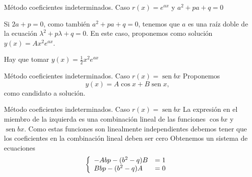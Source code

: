 \documentclass[handout,hyperref={colorlinks=true}]{beamer}
\DeclareMathOperator{\sen}{sen}
\begin{document}
 \begin{frame}{Método coeficientes indeterminados. Caso $r(x)=e^{a x}$  y $a^2+pa+q= 0$}

 Si $2a+p=0$, como también $a^2+pa+q=0$, tenemos que $a$ es una raíz doble de la ecuación $\lambda^2+p\lambda+q=0$. 
 En este caso, proponemos como solución $y(x)=Ax^2e^{ax}$. 
 
 \lstI
 
 Hay que tomar $\boxed{y(x)=\frac{1}{2}x^2e^{ax}}$
 
 
\end{frame}
 
 
 
 \begin{frame}{Método coeficientes indeterminados. Caso $r(x)=\sen bx$}
 Proponemos 
 \[y(x)=A\cos x+ B\sen x,\]
 como candidato a solución. 
 
 \lstI
 
 
 
\end{frame}
 
 
 
 \begin{frame}{Método coeficientes indeterminados. Caso $r(x)=\sen bx$}
La expresión en el miembro de la izquierda es una combinación lineal de las funciones $\cos bx$ y $\sen bx$. Como estas funciones son linealmente independientes
debemos tener que los coeficientes en la combinación lineal deben ser cero
\lstI
Obtenemos un sistema de ecuaciones
\begin{equation}\label{sist_lin_1}
  \left\{\begin{array}{l l}
          -Abp - (b^2 - q)B & = 1\\
          Bbp - (b^2 - q)A &=0
         \end{array}
  \right.
\end{equation}
 
\end{frame}
\end{document}
